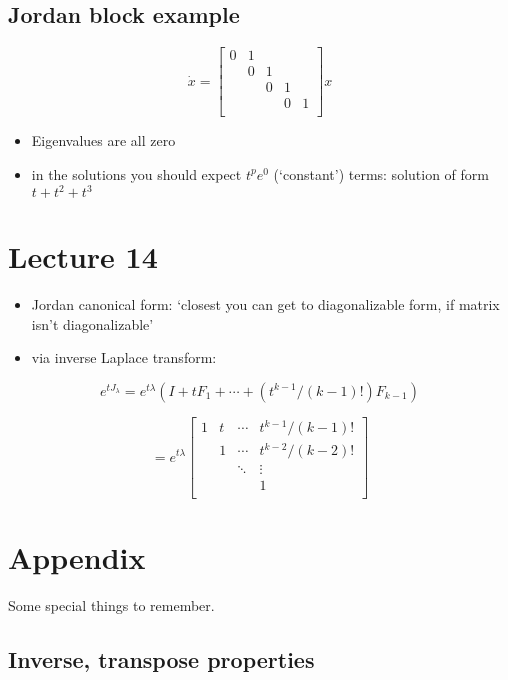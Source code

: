 \documentclass[10pt,letterpaper]{article}
\begin{document}
\subsection{Jordan block example}
\label{sec-11_15}

$$
\dot x=
\begin{bmatrix}
  0 & 1 &   &   &   \\
    & 0 & 1 &   &   \\
    &   & 0 & 1 &   \\
    &   &   & 0 & 1 \\
\end{bmatrix}
x
$$ 
\begin{itemize}
\item Eigenvalues are all zero
\item in the solutions you should expect $t ^{p} e^0$ (`constant') terms: solution of form $t + t ^{2} + t ^{3}$
\end{itemize}
\section{Lecture 14}
\label{sec-12}

\begin{itemize}
\item Jordan canonical form: `closest you can get to diagonalizable form, if matrix isn't diagonalizable'
\item via inverse Laplace transform:
\end{itemize}
$$
e ^{tJ_\lambda} = e ^{t \lambda} (I+t F_1 + \cdots + (t ^{k-1} /(k-1)!) F _{k-1})
$$

$$
= e ^{t \lambda}
\begin{bmatrix}
  1 & t & \cdots & t ^{k-1}/(k-1)! \\
    & 1 & \cdots & t ^{k-2}/(k-2)! \\
    &   & \ddots & \vdots          \\
    &   &        & 1               \\
\end{bmatrix}
$$ 
\section{Appendix}
\label{sec-13}

Some special things to remember.
\subsection{Inverse, transpose properties}
\label{sec-13_1}
\end{document}
